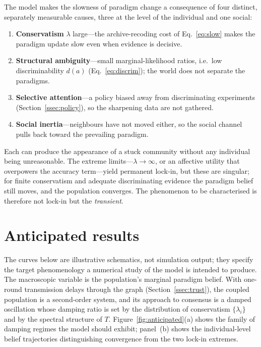 \documentclass[11pt,a4paper]{article}
\begin{document}
The model makes the slowness of paradigm change a consequence of four distinct,
separately measurable causes, three at the level of the individual and one social:
\begin{enumerate}\setlength{\itemsep}{2pt}
\item \textbf{Conservatism} $\lambda$ large---the archive-recoding cost of
  Eq.~\eqref{eq:slow} makes the paradigm update slow even when evidence is decisive.
\item \textbf{Structural ambiguity}---small marginal-likelihood ratios, i.e.\ low
  discriminability $d(a)$ (Eq.~\ref{eq:discrim}); the world does not separate the
  paradigms.
\item \textbf{Selective attention}---a policy biased away from discriminating
  experiments (Section~\ref{ssec:policy}), so the sharpening data are not gathered.
\item \textbf{Social inertia}---neighbours have not moved either, so the social
  channel pulls back toward the prevailing paradigm.
\end{enumerate}
Each can produce the appearance of a stuck community without any individual being
unreasonable. The extreme limits---$\lambda\to\infty$, or an affective utility that
overpowers the accuracy term---yield permanent lock-in, but these are singular; for
finite conservatism and adequate discriminating evidence the paradigm belief still
moves, and the population converges. The phenomenon to be characterised is therefore
not lock-in but the \emph{transient}.

\section{Anticipated results}
\label{sec:anticipated}

The curves below are illustrative schematics, not simulation output; they specify
the target phenomenology a numerical study of the model is intended to produce. The
macroscopic variable is the population's marginal paradigm belief. With one-round
transmission delays through the graph (Section~\ref{ssec:trust}), the coupled
population is a second-order system, and its approach to consensus is a damped
oscillation whose damping ratio is set by the distribution of conservatism
$\{\lambda_i\}$ and by the spectral structure of $T$. Figure~\ref{fig:anticipated}(a)
shows the family of damping regimes the model should exhibit; panel~(b) shows the
individual-level belief trajectories distinguishing convergence from the two lock-in
extremes.
\end{document}
